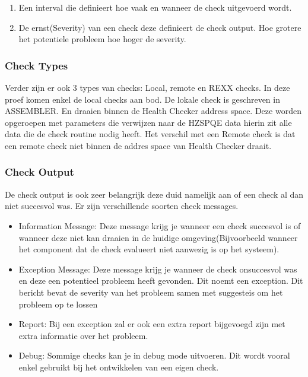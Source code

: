 \begin{enumerate}
	\item Een interval die definieert hoe vaak en wanneer de check uitgevoerd wordt.
	\item De ernst(Severity) van een check deze definieert de check output. Hoe grotere het potentiele probleem hoe hoger de severity. 
\end{enumerate}

\subsubsection{Check Types}
\label{subsubsec:Check Type}

Verder zijn er ook 3 types van checks: Local, remote en REXX checks. In deze proef komen enkel de local checks aan bod. De lokale check is geschreven in ASSEMBLER. En draaien binnen de Health Checker address space. Deze worden opgeroepen met parameters die verwijzen naar de HZSPQE data hierin zit alle data die de check routine nodig heeft. Het verschil met een Remote check is dat een remote check niet binnen de addres space van Health Checker draait. 

\subsubsection{Check Output}
\label{subsubsec:Check Output}

De check output is ook zeer belangrijk deze duid namelijk aan of een check al dan niet succesvol was. Er zijn verschillende soorten check messages.

\begin{itemize}
	\item Information Message: Deze message krijg je wanneer een check succesvol is of wanneer deze niet kan draaien in de huidige omgeving(Bijvoorbeeld wanneer het component dat de check evalueert niet aanwezig is op het systeem).
	\item Exception Message: Deze message krijg je wanneer de check onsuccesvol was en deze een potentieel probleem heeft gevonden. Dit noemt een exception. Dit bericht bevat de severity van het probleem samen met suggesteis om het probleem op te lossen
	\item Report: Bij een exception zal er ook een extra report bijgevoegd zijn met extra informatie over het probleem.
	\item Debug: Sommige checks kan je in debug mode uitvoeren. Dit wordt vooral enkel gebruikt bij het ontwikkelen van een eigen check.	
\end{itemize}

